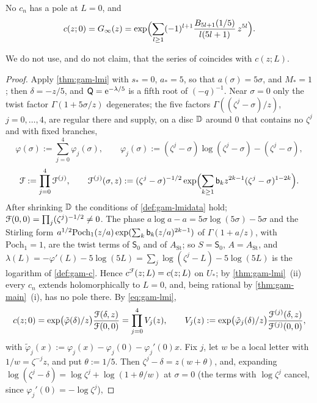 
\begin{thm}
\label{thm:gam-ginf}
No $c_n$ has a pole at $L=0$, and
\begin{equation}
\label{eq:gam-ginf}
c(z;0)=G_{\infty}(z)=\exp\Bigl(\sum_{l\geq 1}(-1)^{l+1}\frac{B_{5l+1}(1/5)}{l(5l+1)}\,z^{5l}\Bigr).
\end{equation}
\end{thm}

We do not use, and do not claim, that the series of \cite{GJR18} coincides with $c(z;L)$.

\begin{proof}
Apply \cref{thm:gam-lmi} with $s_*=0$, $a_*=5$, so that $a(\sigma)=5\sigma$, and $M_*=1$; then $\delta=-z/5$, and $\mathsf Q=\mathrm{e}^{-\lambda/5}$ is a fifth root of $(-q)^{-1}$. Near $\sigma=0$ only the twist factor $\Gamma(1+5\sigma/z)$ degenerates; the five factors $\Gamma((\zeta^j-\sigma)/z)$, $j=0,\dots,4$, are regular there and supply, on a disc $\mathbb{D}$ around $0$ that contains no $\zeta^j$ and with fixed branches,
\[
\varphi(\sigma):=\sum_{j=0}^4\varphi_j(\sigma),\qquad \varphi_j(\sigma):=(\zeta^j-\sigma)\log(\zeta^j-\sigma)-(\zeta^j-\sigma),
\]
\[
\mathcal{F}:=\prod_{j=0}^4\mathcal{F}^{(j)},\qquad \mathcal{F}^{(j)}(\sigma,z):=(\zeta^j-\sigma)^{-1/2}\exp\Bigl(\sum_{k\geq 1}\mathsf{b}_kz^{2k-1}(\zeta^j-\sigma)^{1-2k}\Bigr).
\]
After shrinking $\mathbb{D}$ the conditions of \cref{def:gam-lmidata} hold; $\mathcal{F}(0,0)=\prod_j(\zeta^j)^{-1/2}\neq 0$. The phase $a\log a-a=5\sigma\log(5\sigma)-5\sigma$ and the Stirling form $a^{1/2}\mathrm{Poch}_1(z/a)\exp(\sum_k\mathsf{b}_k(z/a)^{2k-1})$ of $\Gamma(1+a/z)$, with $\mathrm{Poch}_1=1$, are the twist terms of $\mathsf S_0$ and of $A_{\mathrm{St}}$; so $S=\mathsf S_0$, $A=A_{\mathrm{St}}$, and $\lambda(L)=-\varphi'(L)-5\log(5L)=\sum_j\log(\zeta^j-L)-5\log(5L)$ is the logarithm of \cref{def:gam-c}. Hence $c^{\mathcal{F}}(z;L)=c(z;L)$ on $U_*$; by \cref{thm:gam-lmi}~(ii) every $c_n$ extends holomorphically to $L=0$, and, being rational by \cref{thm:gam-main}~(i), has no pole there. By \eqref{eq:gam-lmi},
\[
c(z;0)=\exp\bigl(\tilde\varphi(\delta)/z\bigr)\frac{\mathcal{F}(\delta,z)}{\mathcal{F}(0,0)}=\prod_{j=0}^4V_j(z),\qquad V_j(z):=\exp\bigl(\tilde\varphi_j(\delta)/z\bigr)\frac{\mathcal{F}^{(j)}(\delta,z)}{\mathcal{F}^{(j)}(0,0)},
\]
with $\tilde\varphi_j(x):=\varphi_j(x)-\varphi_j(0)-\varphi_j'(0)x$. Fix $j$, let $w$ be a local letter with $1/w=\zeta^{-j}z$, and put $\theta:=1/5$. Then $\zeta^j-\delta=z(w+\theta)$, and, expanding $\log(\zeta^j-\delta)=\log\zeta^j+\log(1+\theta/w)$ at $\sigma=0$ (the terms with $\log\zeta^j$ cancel, since $\varphi_j'(0)=-\log\zeta^j$),

\end{proof}
